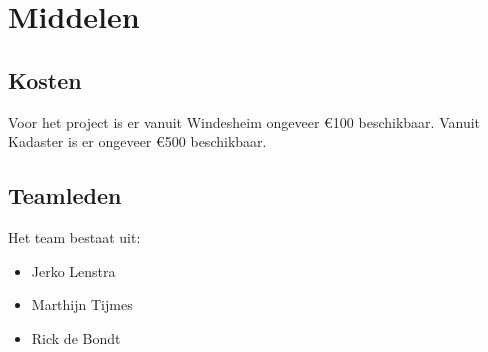 \section{Middelen}
\subsection{Kosten}
Voor het project is er vanuit Windesheim ongeveer \euro{100}
beschikbaar. Vanuit Kadaster is er ongeveer \euro{500} beschikbaar.
\subsection{Teamleden}
Het team bestaat uit:

\begin{itemize}
        \item Jerko Lenstra
        \item Marthijn Tijmes
        \item Rick de Bondt
\end{itemize}
